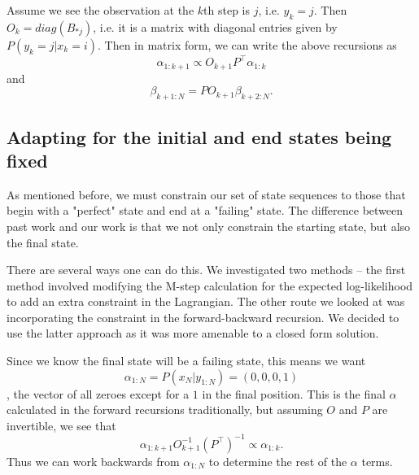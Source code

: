 \documentclass[english]{article}
\numberwithin{equation}{section}
\DeclarePairedDelimiter\paren{(}{)}           %
\begin{document}
	Assume we see the observation at the $k$th step is $j$, i.e. $y_k=j$. Then $O_{k} = diag(B_{*j})$, i.e. it is a matrix with diagonal entries given by $P(y_k=j|x_k=i)$. Then in matrix form, we can write the above recursions as
	$$\alpha_{1:k+1} \propto O_{k+1}P^{\top} \alpha_{1:k}$$
	and
	$$\beta_{k+1:N}=PO_{k+1}\beta_{k+2:N}.$$
	
%	
%	
%	
%	
	
	\subsection*{Adapting for the initial and end states being fixed}
	As mentioned before, we must constrain our set of state sequences to those that begin with a "perfect" state and end at a "failing" state. The difference between past work and our work is that we not only constrain the starting state, but also the final state.
	
	There are several ways one can do this. We investigated two methods -- the first method involved modifying the M-step calculation for the expected log-likelihood to add an extra constraint in the Lagrangian. The other route we looked at was incorporating the constraint in the forward-backward recursion. We decided to use the latter approach as it was more amenable to a closed form solution.
	
	Since we know the final state will be a failing state, this means we want $$\alpha_{1:N}=P(x_N|y_{1:N})=(0,0,0,1)$$, the vector of all zeroes except for a $1$ in the final position. This is the final $\alpha$ calculated in the forward recursions traditionally, but assuming $O$ and $P$ are invertible, we see that $$\alpha_{1:k+1}O_{k+1}^{-1}(P^{\top})^{-1} \propto \alpha_{1:k}.$$ Thus we can work backwards from $\alpha_{1:N}$ to determine the rest of the $\alpha$ terms.
	
\end{document}
